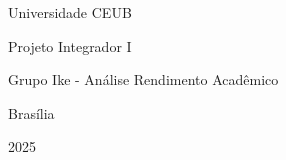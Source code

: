\begin{titlepage}
    \centering
    \vspace*{5cm}
    {\Large Universidade CEUB \par}
    \vspace{0.5cm}
    {\large Projeto Integrador I \par}
    \vspace{0.5cm}
    {\large Grupo Ike - Análise Rendimento Acadêmico\par}
    \vspace{1cm}
    {\large Brasília \par}
    {\large 2025 \par}
\end{titlepage}
